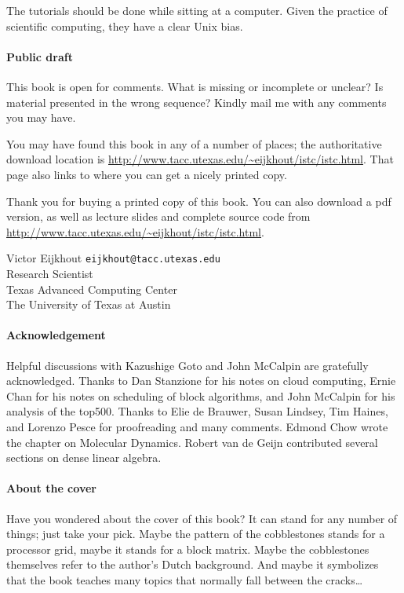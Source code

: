 The tutorials
should be done while sitting at a computer. Given the practice of
scientific computing, they have a clear Unix bias.

\begin{notlulu}
\paragraph*{\bf Public draft}

This book is 
open for comments.
What is missing or incomplete or unclear? Is material
presented in the wrong sequence? Kindly mail me with any comments you
may have.
\end{notlulu}

\begin{download}
You may have found this book in any of a number of places; the
authoritative download location is 
\url{http://www.tacc.utexas.edu/~eijkhout/istc/istc.html}.
That page also links to  where you can get a nicely printed copy.
\end{download}
\begin{lulu}
Thank you for buying a printed copy of this book. 
You can also download a pdf 
version, as well as lecture slides and complete source code from
\url{http://www.tacc.utexas.edu/~eijkhout/istc/istc.html}.
\end{lulu}

\bigskip
\noindent
Victor Eijkhout {\tt eijkhout@tacc.utexas.edu}\\
Research Scientist\\
Texas Advanced Computing Center\\
The University of Texas at Austin

\paragraph*{\bf Acknowledgement}

Helpful discussions with Kazushige Goto and John McCalpin are gratefully
acknowledged. Thanks to Dan Stanzione for his notes on cloud computing,
Ernie Chan for his notes on scheduling of block algorithms, and John
McCalpin for his analysis of the top500.
Thanks to Elie de Brauwer, Susan Lindsey, Tim Haines, and Lorenzo Pesce
for proofreading and many comments.
Edmond Chow wrote the chapter on Molecular Dynamics. Robert van de Geijn
contributed several sections on dense linear algebra.

\begin{lulu}
\pagebreak
\paragraph*{\bf About the cover}

Have you wondered about the cover of this book? It can stand for any
number of things; just take your pick. Maybe the pattern of the
cobblestones stands for a processor grid, maybe it stands for a block
matrix. Maybe the cobblestones themselves refer to the author's Dutch
background. And maybe it symbolizes that the book teaches many topics
that normally fall between the cracks\ldots
\end{lulu}

